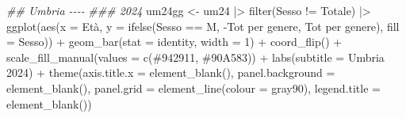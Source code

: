 \documentclass[
]{article}
\newenvironment{Shaded}{\begin{snugshade}}{\end{snugshade}}
\newcommand{\AttributeTok}[1]{\textcolor[rgb]{0.40,0.45,0.13}{#1}}
\newcommand{\DecValTok}[1]{\textcolor[rgb]{0.68,0.00,0.00}{#1}}
\newcommand{\DocumentationTok}[1]{\textcolor[rgb]{0.37,0.37,0.37}{\textit{#1}}}
\newcommand{\FunctionTok}[1]{\textcolor[rgb]{0.28,0.35,0.67}{#1}}
\newcommand{\NormalTok}[1]{\textcolor[rgb]{0.00,0.23,0.31}{#1}}
\newcommand{\OtherTok}[1]{\textcolor[rgb]{0.00,0.23,0.31}{#1}}
\newcommand{\SpecialCharTok}[1]{\textcolor[rgb]{0.37,0.37,0.37}{#1}}
\newcommand{\StringTok}[1]{\textcolor[rgb]{0.13,0.47,0.30}{#1}}
\begin{document}
\begin{Shaded}
\begin{Highlighting}[]
\DocumentationTok{\#\# Umbria {-}{-}{-}{-}}
\DocumentationTok{\#\#\# 2024}
\NormalTok{um24gg }\OtherTok{\textless{}{-}}\NormalTok{ um24 }\SpecialCharTok{|\textgreater{}} 
  \FunctionTok{filter}\NormalTok{(Sesso }\SpecialCharTok{!=} \StringTok{\textquotesingle{}Totale\textquotesingle{}}\NormalTok{) }\SpecialCharTok{|\textgreater{}}
  \FunctionTok{ggplot}\NormalTok{(}\FunctionTok{aes}\NormalTok{(}\AttributeTok{x =}\NormalTok{ Età,}
             \AttributeTok{y =} \FunctionTok{ifelse}\NormalTok{(Sesso }\SpecialCharTok{==} \StringTok{\textquotesingle{}M\textquotesingle{}}\NormalTok{,}
                        \SpecialCharTok{{-}}\StringTok{\textasciigrave{}}\AttributeTok{Tot per genere}\StringTok{\textasciigrave{}}\NormalTok{, }\StringTok{\textasciigrave{}}\AttributeTok{Tot per genere}\StringTok{\textasciigrave{}}\NormalTok{),}
             \AttributeTok{fill =}\NormalTok{ Sesso)) }\SpecialCharTok{+}
  \FunctionTok{geom\_bar}\NormalTok{(}\AttributeTok{stat =} \StringTok{\textquotesingle{}identity\textquotesingle{}}\NormalTok{, }\AttributeTok{width =} \DecValTok{1}\NormalTok{) }\SpecialCharTok{+}
  \FunctionTok{coord\_flip}\NormalTok{() }\SpecialCharTok{+}
  \FunctionTok{scale\_fill\_manual}\NormalTok{(}\AttributeTok{values =} \FunctionTok{c}\NormalTok{(}\StringTok{\textquotesingle{}\#942911\textquotesingle{}}\NormalTok{, }\StringTok{\textquotesingle{}\#90A583\textquotesingle{}}\NormalTok{)) }\SpecialCharTok{+}
  \FunctionTok{labs}\NormalTok{(}\AttributeTok{subtitle =} \StringTok{\textquotesingle{}Umbria 2024\textquotesingle{}}\NormalTok{) }\SpecialCharTok{+}
  \FunctionTok{theme}\NormalTok{(}\AttributeTok{axis.title.x =} \FunctionTok{element\_blank}\NormalTok{(),}
        \AttributeTok{panel.background =} \FunctionTok{element\_blank}\NormalTok{(),}
        \AttributeTok{panel.grid =} \FunctionTok{element\_line}\NormalTok{(}\AttributeTok{colour =} \StringTok{\textquotesingle{}gray90\textquotesingle{}}\NormalTok{),}
        \AttributeTok{legend.title =} \FunctionTok{element\_blank}\NormalTok{())}


\end{Highlighting}
\end{Shaded}
\end{document}
